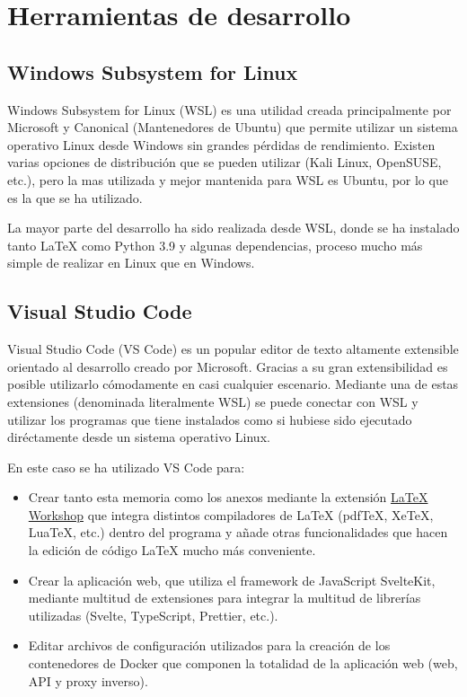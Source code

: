 \label{cha:Técnicas y herraminetas}

\section{Herramientas de desarrollo}


\subsection{Windows Subsystem for Linux}

Windows Subsystem for Linux (WSL) es una utilidad creada principalmente por
Microsoft y Canonical (Mantenedores de Ubuntu) que permite utilizar un sistema
operativo Linux desde Windows sin grandes pérdidas de rendimiento. Existen
varias opciones de distribución que se pueden utilizar (Kali Linux, OpenSUSE,
etc.), pero la mas utilizada y mejor mantenida para WSL es Ubuntu, por lo que es
la que se ha utilizado.

La mayor parte del desarrollo ha sido realizada desde WSL, donde se ha instalado
tanto \LaTeX{} como Python 3.9 y algunas dependencias, proceso mucho más simple
de realizar en Linux que en Windows.

\subsection{Visual Studio Code}

Visual Studio Code (VS Code) es un popular editor de texto altamente extensible
orientado al desarrollo creado por Microsoft. Gracias a su gran extensibilidad
es posible utilizarlo cómodamente en casi cualquier escenario. Mediante una de
estas extensiones (denominada literalmente WSL) se puede conectar con WSL y
utilizar los programas que tiene instalados como si hubiese sido ejecutado
diréctamente desde un sistema operativo Linux.

En este caso se ha utilizado VS Code para:

\begin{itemize}
    \item Crear tanto esta memoria como los anexos mediante la extensión
          \href{https://github.com/James-Yu/LaTeX-Workshop}{\LaTeX{} Workshop}
          que integra distintos compiladores de \LaTeX{} (pdfTeX, XeTeX, LuaTeX,
          etc.) dentro del programa y añade otras funcionalidades que hacen la
          edición de código \LaTeX{} mucho más conveniente.
    \item Crear la aplicación web, que utiliza el framework de JavaScript
          SvelteKit, mediante multitud de extensiones para integrar la multitud
          de librerías utilizadas (Svelte, TypeScript, Prettier, etc.).
    \item Editar archivos de configuración utilizados para la creación de los
          contenedores de Docker que componen la totalidad de la aplicación web
          (web, API y proxy inverso).
\end{itemize}


